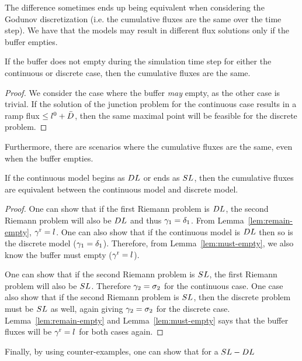 The difference sometimes ends up being equivalent when considering
the Godunov discretization (i.e. the cumulative fluxes are the same
over the time step). We have that the models may result in different
flux solutions only if the buffer empties.
\begin{lem}
\label{lem:must-empty}If the buffer does not empty during the simulation
time step for either the continuous or discrete case, then the cumulative
fluxes are the same.
\end{lem}
\begin{proof}
We consider the case where the buffer \emph{may} empty, as the other case is trivial. If the solution of the junction problem for the continuous case results in a ramp flux $\le l_{}^{0} + \bar{D}$, then the same maximal point will be feasible for the discrete problem.
\end{proof}
Furthermore, there are scenarios where the cumulative fluxes are the
same, even when the buffer empties.
\begin{lem}
\label{dl-sl-cool}If the continuous model begins as $DL$
or ends as $SL$, then the cumulative fluxes are equivalent
between the continuous model and discrete model.\end{lem}
\begin{proof}
One can show that if the first Riemann problem is $DL$,
the second Riemann problem will also be $DL$ and thus
$\gamma_{1}=\delta_{1}$. From Lemma~\ref{lem:remain-empty},
$\gamma^{\text{r}}=l$. One can also show that if the
continuous model is $DL$ then so is the discrete model
($\gamma_{1}=\delta_{1}$). Therefore,
from Lemma~\ref{lem:must-empty}, we also know the buffer must empty
($\gamma^{\text{r}}=l$).

One can show that if the second Riemann problem is $SL$,
the first Riemann problem will also be $SL$. Therefore
$\gamma_{2}=\sigma_{2}$ for the
continuous case. One case also show that if the second Riemann problem
is $SL$, then the discrete problem must be $SL$
as well, again giving $\gamma_{2}=\sigma_{2}$
for the discrete case. Lemma~\ref{lem:remain-empty} and Lemma~\ref{lem:must-empty}
says that the buffer fluxes will be $\gamma^{\text{r}}=l$
for both cases again.
\end{proof}
Finally, by using counter-examples, one can show that for a $SL-DL$
